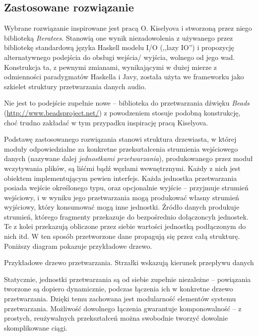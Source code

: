 \subsection{Zastosowane rozwiązanie}

Wybrane rozwiązanie inspirowane jest pracą O. Kiselyova i stworzoną przez niego biblioteką
\emph{Iteratees}. Stanowią one wynik niezadowolenia z używanego przez bibliotekę standardową języka
Haskell modelu I/O (,,lazy IO'') i propozycję alternatywnego podejścia do obsługi wejścia\slash
wyjścia, wolnego od jego wad. Konstrukcja ta, z pewnymi zmianami, wynikającymi w dużej mierze z
odmienności paradygmatów Haskella i Javy, została użyta we frameworku jako szkielet struktury
przetwarzania danych audio.

\begin{Note}
  Nie jest to podejście zupełnie nowe -- biblioteka do przetwarzania dźwięku \emph{Beads}
  (\url{http://www.beadsproject.net/}) z powodzeniem stosuje podobną konstrukcję, choć trudno
  zakładać w tym przypadku inspirację pracą Kiselyova.
\end{Note}

Podstawę zastosowanego rozwiązania stanowi struktura drzewiasta, w której moduły odpowiedzialne za
konkretne przekształcenia strumienia wejściowego danych (nazywane dalej \emph{jednostkami
przetwarzania}), produkowanego przez moduł wczytywania plików, są liśćmi bądź węzłami wewnętrznymi.
Każdy z nich jest obiektem implementującym pewien interfejs.  Każda jednostka przetwarzania posiada
wejście określonego typu, oraz opcjonalnie wyjście -- przyjmuje strumień wejściowy, i w wyniku jego
przetwarzania mogą produkować własny strumień wyjściowy, który konsumować mogą inne jednostki.
Źródło danych produkuje strumień, którego fragmenty przekazuje do bezpośrednio dołączoncyh
jednostek. Te z kolei przekazują obliczone przez siebie wartości jednostką podłączonym do nich itd.
W ten sposób przetworzone dane propagują się przez całą strukturę. Poniższy diagram pokazuje
przykładowe drzewo.


{Przykładowe drzewo przetwarzania. Strzałki wskazują kierunek przepływu danych}


Statycznie, jednostki przetwarzania są od siebie zupełnie niezależne -- powiązania tworzone są
dopiero dynamicznie, podczas łączenia ich w konkretne drzewo przetwarzania. Dzięki temu zachowana
jest modularność elementów systemu przetwarzania. Możliwość dowolnego łączenia gwarantuje
komponowalność -- z prostych, reużywalnych przekształceń można swobodnie tworzyć dowolnie
skomplikowane ciągi.

